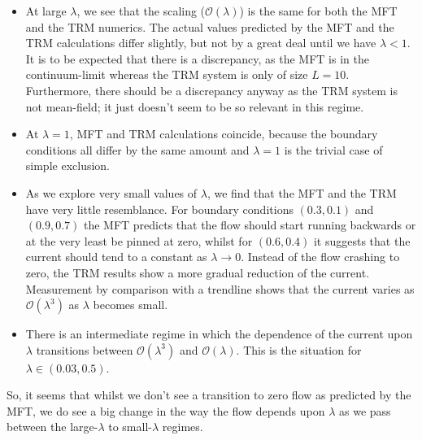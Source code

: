 \begin{itemize}
 \item At large $\lambda$, we see that the scaling ($\mathcal{O}(\lambda)$) is the same for both the MFT
 and the TRM numerics. The actual values predicted by the MFT and the TRM calculations differ slightly,
 but not by a great deal until we have $\lambda < 1$. It is to be expected that there is a discrepancy,
 as the MFT is in the continuum-limit whereas the TRM system is only of size $L=10$. Furthermore, there
 should be a discrepancy anyway as the TRM system is not mean-field; it just doesn't seem to be so relevant
 in this regime.
 \item At $\lambda=1$, MFT and TRM calculations coincide, because the boundary conditions all differ
 by the same amount and $\lambda=1$ is the trivial case of simple exclusion.
 \item As we explore very small values of $\lambda$, we find that the MFT and the TRM have very little 
 resemblance. For boundary conditions $(0.3, 0.1)$ and $(0.9, 0.7)$ the MFT predicts that the flow should
 start running backwards or at the very least be pinned at zero,
 whilst for $(0.6, 0.4)$ it suggests that the current should tend to a constant
 as $\lambda \rightarrow 0$. 
 Instead of the flow crashing to zero, the TRM results show a more gradual reduction of the current.
 Measurement by comparison with a trendline shows that the current varies as $\mathcal{O}(\lambda^3)$ as 
 $\lambda$ becomes small.
 \item There is an intermediate regime in which the dependence of the current upon $\lambda$ transitions
 between $\mathcal{O}(\lambda^3)$ and $\mathcal{O}(\lambda)$. This is the situation for $\lambda \in (0.03, 0.5)$.

\end{itemize}
So, it seems that whilst we don't see a transition to zero flow as predicted by the MFT, we do see
a big change in the way the flow depends upon $\lambda$ as we pass between the large-$\lambda$ to 
small-$\lambda$ regimes.


